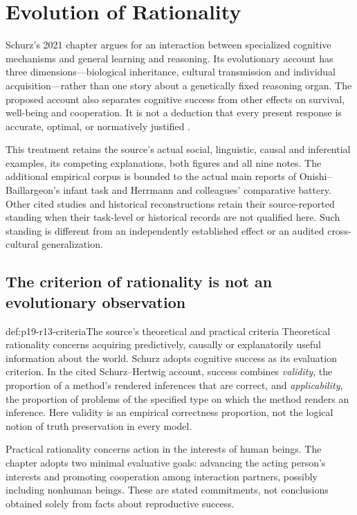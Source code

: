 \chapter{Evolution of Rationality}
\label{sec:p19-rationality-1-3}

Schurz's 2021 chapter argues for an interaction between specialized cognitive
mechanisms and general learning and reasoning. Its evolutionary account has
three dimensions---biological inheritance, cultural transmission and
individual acquisition---rather than one story about a genetically fixed
reasoning organ. The proposed account also separates cognitive success from
other effects on survival, well-being and cooperation. It is not a deduction
that every present response is accurate, optimal, or normatively justified
\cite[pp.~101--113]{Schurz2021EvolutionRationality}.

This treatment retains the source's actual social, linguistic, causal and
inferential examples, its competing explanations, both figures and all nine
notes. The additional empirical corpus is bounded to the actual main reports
of Onishi--Baillargeon's infant task and Herrmann and colleagues' comparative
battery. Other cited studies and historical reconstructions retain their
source-reported standing when their task-level or historical records are not
qualified here. Such standing is different from an independently established
effect or an audited cross-cultural generalization.

\section{The criterion of rationality is not an evolutionary observation}
\label{sec:p19-r13-criteria}

\begin{hbdefinition}{def:p19-r13-criteria}{The source's theoretical and practical criteria}
Theoretical rationality concerns acquiring predictively, causally or
explanatorily useful information about the world. Schurz adopts cognitive
success as its evaluation criterion. In the cited Schurz--Hertwig account,
success combines \emph{validity}, the proportion of a method's rendered
inferences that are correct, and \emph{applicability}, the proportion of
problems of the specified type on which the method renders an inference.
Here validity is an empirical correctness proportion, not the logical
notion of truth preservation in every model.

Practical rationality concerns action in the interests of human beings.
The chapter adopts two minimal evaluative goals: advancing the acting
person's interests and promoting cooperation among interaction partners,
possibly including nonhuman beings. These are stated commitments, not
conclusions obtained solely from facts about reproductive success.
\end{hbdefinition}

